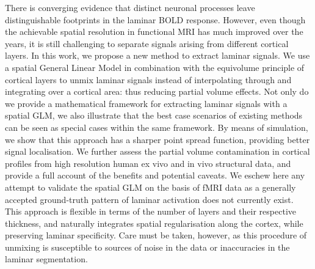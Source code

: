 There is converging evidence that distinct neuronal processes leave distinguishable footprints in the laminar BOLD response. However, even though the achievable spatial resolution in functional MRI has much improved over the years, it is still challenging to separate signals arising from different cortical layers. In this work, we propose a new method to extract laminar signals.
We use a spatial General Linear Model in combination with the equivolume principle of cortical layers to unmix laminar signals instead of interpolating through and integrating over a cortical area: thus reducing partial volume effects. Not only do we provide a mathematical framework for extracting laminar signals with a spatial GLM, we also illustrate that the best case scenarios of existing methods can be seen as special cases within the same framework. 
By means of simulation, we show that this approach has a sharper point spread function, providing better signal localisation. 
We further assess the partial volume contamination in cortical profiles from high resolution human ex vivo and in vivo structural data, and provide a full account of the benefits and potential caveats. We eschew here any attempt to validate the spatial GLM on the basis of fMRI data as a generally accepted ground-truth pattern of laminar activation does not currently exist.
This approach is flexible in terms of the number of layers and their respective thickness, and naturally integrates spatial regularisation along the cortex, while preserving laminar specificity. Care must be taken, however, as this procedure of unmixing is susceptible to sources of noise in the data or inaccuracies in the laminar segmentation.
